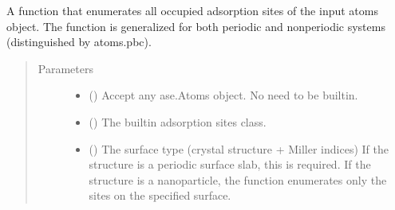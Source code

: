 \documentclass[letterpaper,10pt,english]{sphinxmanual}
\begin{document}

\begin{fulllineitems}
\label{\detokenize{modules:acat.adsorbate_coverage.enumerate_occupied_sites}}
A function that enumerates all occupied adsorption sites of
the input atoms object. The function is generalized for both
periodic and non\sphinxhyphen{}periodic systems (distinguished by atoms.pbc).
\begin{quote}\begin{description}
\item[{Parameters}] \leavevmode\begin{itemize}
\item {} 
 () \textendash{} Accept any ase.Atoms object. No need to be built\sphinxhyphen{}in.

\item {} 
 (\sphinxstyleliteralemphasis{\sphinxupquote{,         }}) \textendash{} The built\sphinxhyphen{}in adsorption sites class.

\item {} 
 (\sphinxstyleliteralemphasis{\sphinxupquote{, }}) \textendash{} The surface type (crystal structure + Miller indices)
If the structure is a periodic surface slab, this is required.
If the structure is a nanoparticle, the function enumerates
only the sites on the specified surface.


\end{itemize}
\end{description}
\end{quote}
\end{fulllineitems}
\end{document}
